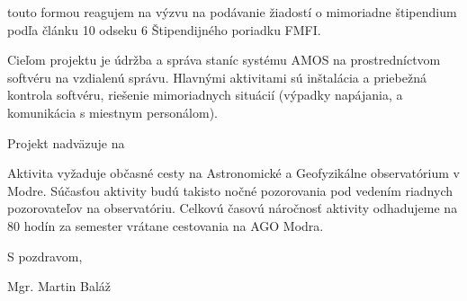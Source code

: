 \documentclass[12pt, a4paper, oneside]{report}
\begin{document}
    touto formou reagujem na výzvu na podávanie žiadostí o mimoriadne štipendium podľa
    článku 10 odseku 6 Štipendijného poriadku FMFI.
    
    Cieľom projektu je údržba a správa staníc systému AMOS na prostredníctvom softvéru na vzdialenú správu.
    Hlavnými aktivitami sú inštalácia a priebežná kontrola softvéru, riešenie mimoriadnych situácií
    (výpadky napájania, a komunikácia s miestnym personálom).
    
    Projekt nadväzuje na 
        
    Aktivita vyžaduje občasné cesty na Astronomické a Geofyzikálne observatórium v Modre.
    Súčasťou aktivity budú takisto nočné pozorovania pod vedením riadnych pozorovateľov na observatóriu.
    Celkovú časovú náročnosť aktivity odhadujeme na 80 hodín za semester vrátane cestovania na AGO Modra.
        
    \vspace*{12mm}
    
    S pozdravom,
    
    \hfill Mgr. Martin Baláž

    
\end{document}
